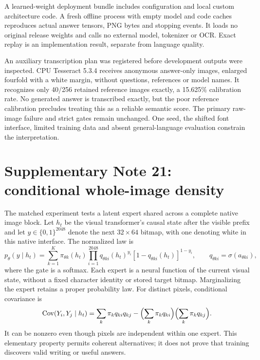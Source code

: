 \documentclass[10pt,a4paper]{article}
\begin{document}
A learned-weight deployment bundle includes configuration and local custom
architecture code. A fresh offline process with empty model and code caches
reproduces actual answer tensors, PNG bytes and stopping events. It loads no
original release weights and calls no external model, tokenizer or OCR.
Exact replay is an implementation result, separate from language quality.

An auxiliary transcription plan was registered before development outputs
were inspected. CPU Tesseract 5.3.4 receives anonymous answer-only images,
enlarged fourfold with a white margin, without questions, references or model
names. It recognizes only 40/256 retained reference images exactly, a 15.625\%
calibration rate. No generated answer is transcribed exactly, but the poor
reference calibration precludes treating this as a reliable semantic score.
The primary raw-image failure and strict gates remain unchanged. One seed,
the shifted font interface, limited training data and absent general-language
evaluation constrain the interpretation.

\section*{Supplementary Note 21: conditional whole-image density}
The matched experiment tests a latent expert shared across a complete native
image block. Let $h_t$ be the visual transformer's causal state after the
visible prefix and let $y\in\{0,1\}^{2048}$ denote the next $32\times64$
bitmap, with one denoting white in this native interface. The normalized law is
\begin{equation}
 p_\theta(y\mid h_t)=\sum_{k=1}^{K}\pi_{\theta k}(h_t)
 \prod_{i=1}^{2048}q_{\theta ki}(h_t)^{y_i}
 [1-q_{\theta ki}(h_t)]^{1-y_i},
 \qquad q_{\theta ki}=\sigma(a_{\theta ki}),
\end{equation}
where the gate is a softmax. Each expert is a neural function of the current
visual state, without a fixed character identity or stored target bitmap.
Marginalizing the expert retains a proper probability law. For distinct
pixels, conditional covariance is
\begin{equation}
 \operatorname{Cov}(Y_i,Y_j\mid h_t)
 =\sum_k\pi_k q_{ki}q_{kj}
 -\Bigl(\sum_k\pi_k q_{ki}\Bigr)\Bigl(\sum_k\pi_k q_{kj}\Bigr).
\end{equation}
It can be nonzero even though pixels are independent within one expert.
This elementary property permits coherent alternatives; it does not prove
that training discovers valid writing or useful answers.
\end{document}
